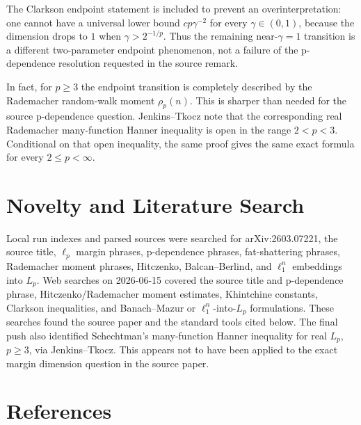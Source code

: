 \documentclass[11pt]{article}
\begin{document}
The Clarkson endpoint statement is included to prevent an overinterpretation:
one cannot have a universal lower bound \(c p\gamma^{-2}\) for every
\(\gamma\in(0,1)\), because the dimension drops to \(1\) when
\(\gamma>2^{-1/p}\).  Thus the remaining near-\(\gamma=1\) transition is a
different two-parameter endpoint phenomenon, not a failure of the
p-dependence resolution requested in the source remark.

In fact, for \(p\ge3\) the endpoint transition is completely described by the
Rademacher random-walk moment \(\rho_p(n)\).  This is sharper than needed for
the source p-dependence question.  Jenkins--Tkocz note that the corresponding
real Rademacher many-function Hanner inequality is open in the range
\(2<p<3\).  Conditional on that open inequality, the same proof gives the
same exact formula for every \(2\le p<\infty\).

\section*{Novelty and Literature Search}

Local run indexes and parsed sources were searched for arXiv:2603.07221, the
source title, \(\ell_p\) margin phrases, p-dependence phrases, fat-shattering
phrases, Rademacher moment phrases, Hitczenko, Balcan--Berlind, and
\(\ell_1^n\) embeddings into \(L_p\).  Web searches on 2026-06-15 covered the
source title and p-dependence phrase, Hitczenko/Rademacher moment estimates,
Khintchine constants, Clarkson inequalities, and Banach--Mazur or
\(\ell_1^n\)-into-\(L_p\) formulations.  These searches found the source
paper and the standard tools cited below.  The final push also identified
Schechtman's many-function Hanner inequality for real \(L_p\), \(p\ge3\), via
Jenkins--Tkocz.  This appears not to have been applied to the exact margin
dimension question in the source paper.

\section*{References}
\end{document}
